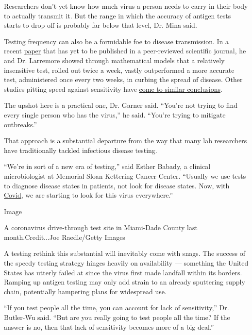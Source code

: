 Researchers don't yet know how much virus a person needs to carry in
their body to actually transmit it. But the range in which the accuracy
of antigen tests starts to drop off is probably far below that level,
Dr. Mina said.

Testing frequency can also be a formidable foe to disease transmission.
In a recent
\href{https://www.medrxiv.org/content/10.1101/2020.06.22.20136309v2}{paper}
that has yet to be published in a peer-reviewed scientific journal, he
and Dr. Larremore showed through mathematical models that a relatively
insensitive test, rolled out twice a week, vastly outperformed a more
accurate test, administered once every two weeks, in curbing the spread
of disease. Other studies pitting speed against sensitivity have
\href{https://jamanetwork.com/journals/jamanetworkopen/fullarticle/2768923}{come
to similar conclusions}.

The upshot here is a practical one, Dr. Garner said. ``You're not trying
to find every single person who has the virus,'' he said. ``You're
trying to mitigate outbreaks.''

That approach is a substantial departure from the way that many lab
researchers have traditionally tackled infectious disease testing.

``We're in sort of a new era of testing,'' said Esther Babady, a
clinical microbiologist at Memorial Sloan Kettering Cancer Center.
``Usually we use tests to diagnose disease states in patients, not look
for disease states. Now, with
\href{https://www.nytimes3xbfgragh.onion/2020/08/07/us/covid-test-accuracy-governor-dewine-ohio.html}{Covid},
we are starting to look for this virus everywhere.''

Image

A coronavirus drive-through test site in Miami-Dade County last
month.Credit...Joe Raedle/Getty Images

A testing rethink this substantial will inevitably come with snags. The
success of the speedy testing strategy hinges heavily on availability
--- something the United States has utterly failed at since the virus
first made landfall within its borders. Ramping up antigen testing may
only add strain to an already sputtering supply chain, potentially
hampering plans for widespread use.

``If you test people all the time, you can account for lack of
sensitivity,'' Dr. Butler-Wu said. ``But are you really going to test
people all the time? If the answer is no, then that lack of sensitivity
becomes more of a big deal.''

